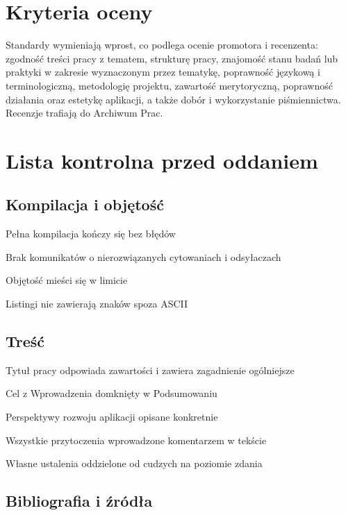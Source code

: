 \section{Kryteria oceny}

Standardy wymieniają wprost, co podlega ocenie promotora i recenzenta: zgodność treści pracy z tematem, strukturę pracy, znajomość stanu badań lub praktyki w zakresie wyznaczonym przez tematykę, poprawność językową i terminologiczną, metodologię projektu, zawartość merytoryczną, poprawność działania oraz estetykę aplikacji, a także dobór i wykorzystanie piśmiennictwa. Recenzje trafiają do Archiwum Prac.

\section{Lista kontrolna przed oddaniem}\label{sec:listakontrolna}

\subsection*{Kompilacja i objętość}

\begin{kontrolna}
\item Pełna kompilacja kończy się bez błędów
\item Brak komunikatów o nierozwiązanych cytowaniach i odsyłaczach
\item Objętość mieści się w limicie
\item Listingi nie zawierają znaków spoza ASCII
\end{kontrolna}

\subsection*{Treść}

\begin{kontrolna}
\item Tytuł pracy odpowiada zawartości i zawiera zagadnienie ogólniejsze
\item Cel z Wprowadzenia domknięty w Podsumowaniu
\item Perspektywy rozwoju aplikacji opisane konkretnie
\item Wszystkie przytoczenia wprowadzone komentarzem w tekście
\item Własne ustalenia oddzielone od cudzych na poziomie zdania
\end{kontrolna}

\subsection*{Bibliografia i źródła}

